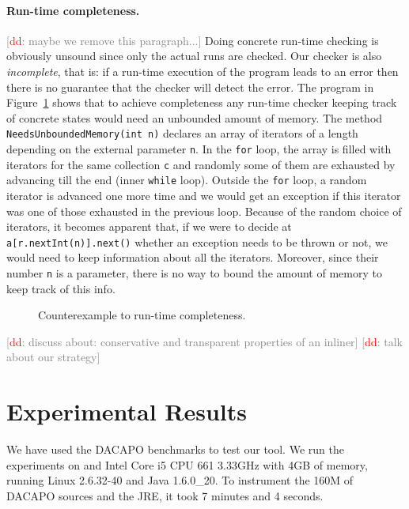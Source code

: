 \documentclass{sigplanconf}[10pt] %
\newcommand{\noterg}[2]{\textcolor{gray}{[\textcolor{red}{#1}: #2]}}
\newcommand{\dd}[1]{\noterg{dd}{#1}}
\newcommand{\dinocomment}[1]{\dd{#1}}
\begin{document}





\paragraph{Run-time completeness.}
\dinocomment{maybe we remove this paragraph...}
Doing concrete run-time checking is obviously unsound since only the actual runs are checked. 
Our checker is also {\em incomplete}, that is:  
if a run-time execution of the program leads to an error then there is no guarantee that 
the checker will detect the error.  The program in Figure~\ref{fig:completeness} shows that to
achieve completeness any run-time checker keeping track of concrete states would need an unbounded
amount of memory. The method {\tt NeedsUnboundedMemory(int n)}
declares an array of iterators of a length depending on the external parameter {\tt n}.  In the {\tt for} loop, the array is filled with iterators for the same collection {\tt c} and randomly some of them are exhausted by advancing till the end (inner {\tt while} loop).
Outside the {\tt for} loop, a random iterator is advanced one more time and we would get an exception if this iterator 
was one of those exhausted in the previous loop. Because of the random choice of iterators, it becomes apparent that, 
if we were to decide at {\tt a[r.nextInt(n)].next()} whether an exception needs to be thrown or not, we would need to keep information about all the iterators. Moreover, since their number {\tt n} is a parameter, there is no way to bound the amount of memory to keep track of this info. 
\begin{figure}[htbp]
\begin{center}

\caption{Counterexample to run-time completeness.}
\label{fig:completeness}
\end{center}
\end{figure}

\dinocomment{discuss about: conservative and transparent properties of an inliner}
\dinocomment{talk about our strategy}


\section{Experimental Results}
We have used the DACAPO \cite{..} benchmarks to test our tool.
We run the experiments on and Intel  Core i5 CPU  661  \@ 3.33GHz with 4GB of memory, running 
 Linux 2.6.32-40 and  Java 1.6.0\_20.
To instrument the 160M of DACAPO sources and the JRE, it took  7 minutes and 4 seconds.
\end{document}
